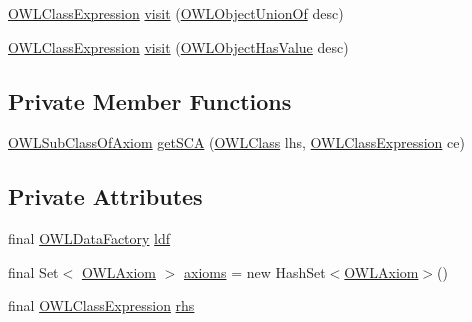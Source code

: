\begin{DoxyCompactItemize}
\item 
\hyperlink{interfaceorg_1_1semanticweb_1_1owlapi_1_1model_1_1_o_w_l_class_expression}{O\-W\-L\-Class\-Expression} \hyperlink{classorg_1_1semanticweb_1_1owlapi_1_1util_1_1_structural_transformation_1_1_axiom_flattener_a27d97567d6e9625cd72848c8b91e5077}{visit} (\hyperlink{interfaceorg_1_1semanticweb_1_1owlapi_1_1model_1_1_o_w_l_object_union_of}{O\-W\-L\-Object\-Union\-Of} desc)
\item 
\hyperlink{interfaceorg_1_1semanticweb_1_1owlapi_1_1model_1_1_o_w_l_class_expression}{O\-W\-L\-Class\-Expression} \hyperlink{classorg_1_1semanticweb_1_1owlapi_1_1util_1_1_structural_transformation_1_1_axiom_flattener_ac11bb9a8605408affdae81d354a51e8b}{visit} (\hyperlink{interfaceorg_1_1semanticweb_1_1owlapi_1_1model_1_1_o_w_l_object_has_value}{O\-W\-L\-Object\-Has\-Value} desc)
\end{DoxyCompactItemize}
\subsection*{Private Member Functions}
\begin{DoxyCompactItemize}
\item 
\hyperlink{interfaceorg_1_1semanticweb_1_1owlapi_1_1model_1_1_o_w_l_sub_class_of_axiom}{O\-W\-L\-Sub\-Class\-Of\-Axiom} \hyperlink{classorg_1_1semanticweb_1_1owlapi_1_1util_1_1_structural_transformation_1_1_axiom_flattener_af32eb022dbd09d9f0917d34aef000135}{get\-S\-C\-A} (\hyperlink{interfaceorg_1_1semanticweb_1_1owlapi_1_1model_1_1_o_w_l_class}{O\-W\-L\-Class} lhs, \hyperlink{interfaceorg_1_1semanticweb_1_1owlapi_1_1model_1_1_o_w_l_class_expression}{O\-W\-L\-Class\-Expression} ce)
\end{DoxyCompactItemize}
\subsection*{Private Attributes}
\begin{DoxyCompactItemize}
\item 
final \hyperlink{interfaceorg_1_1semanticweb_1_1owlapi_1_1model_1_1_o_w_l_data_factory}{O\-W\-L\-Data\-Factory} \hyperlink{classorg_1_1semanticweb_1_1owlapi_1_1util_1_1_structural_transformation_1_1_axiom_flattener_aab52ae2ad38d214793fb6765cfea523e}{ldf}
\item 
final Set$<$ \hyperlink{interfaceorg_1_1semanticweb_1_1owlapi_1_1model_1_1_o_w_l_axiom}{O\-W\-L\-Axiom} $>$ \hyperlink{classorg_1_1semanticweb_1_1owlapi_1_1util_1_1_structural_transformation_1_1_axiom_flattener_ac2afdda368ae817bd84bb54973eb76ce}{axioms} = new Hash\-Set$<$\hyperlink{interfaceorg_1_1semanticweb_1_1owlapi_1_1model_1_1_o_w_l_axiom}{O\-W\-L\-Axiom}$>$()
\item 
final \hyperlink{interfaceorg_1_1semanticweb_1_1owlapi_1_1model_1_1_o_w_l_class_expression}{O\-W\-L\-Class\-Expression} \hyperlink{classorg_1_1semanticweb_1_1owlapi_1_1util_1_1_structural_transformation_1_1_axiom_flattener_aaf931e36c84b350f97ce5ec6f370b2ef}{rhs}
\end{DoxyCompactItemize}


